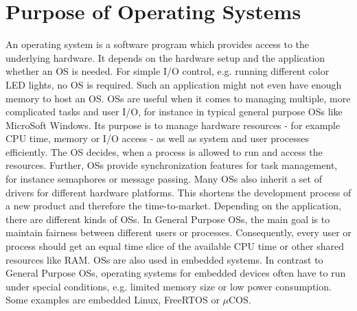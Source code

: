 \section{Purpose of Operating Systems}
An operating system is a software program which provides access to the underlying hardware. 
It depends on the hardware setup and the application whether an \ac{OS} is needed.
For simple \ac{I/O} control, e.g. running different color LED lights, no \ac{OS} is required.
Such an application might not even have enough memory to host an \ac{OS}.
\acp{OS} are useful when it comes to managing multiple, more complicated tasks and user \ac{I/O}, for instance in typical general purpose \acp{OS} like MicroSoft Windows.
Its purpose is to manage hardware resources - for example \ac{CPU} time, memory or \ac{I/O} access - as well as system and user processes efficiently. 
The \ac{OS} decides, when a process is allowed to run and access the resources.
Further, \acp{OS} provide synchronization features for task management, for instance semaphores or message passing.
Many \acp{OS} also inherit a set of drivers for different hardware platforms.
This shortens the development process of a new product and therefore the time-to-market.
Depending on the application, there are different kinds of \acp{OS}. 
In General Purpose \acp{OS}, the main goal is to maintain fairness between different users or processes. 
Consequently, every user or process should get an equal time slice of the available \ac{CPU} time or other shared resources like \ac{RAM}. 
\acp{OS} are also used in embedded systems. 
In contrast to General Purpose \acp{OS}, operating systems for embedded devices often have to run under special conditions, e.g. limited memory size or low power consumption. 
Some examples are embedded Linux, FreeRTOS or $\mu$COS.

